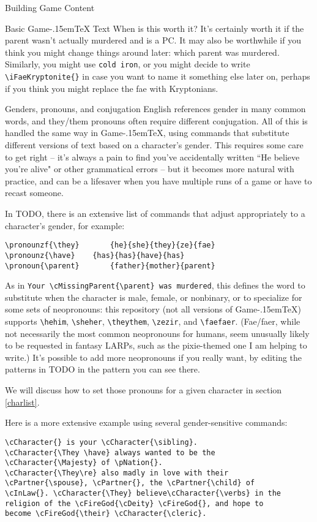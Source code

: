 \documentclass[11pt,  total={6in, 8in}]{article}
\def\gametex{\mbox{Game\kern-.15em\TeX}}
\newcommand{\pronounfile}{TODO}
\begin{document}
\begin{section}{Building Game Content}
\begin{subsection}{Basic \gametex{} Text}
When is this worth it?  It's certainly worth it if the parent wasn't actually murdered and is a PC.  It may also be worthwhile if you think you might change things around later: which parent was murdered.  Similarly, you might use \lstinline|cold iron|, or you might decide to write \lstinline|\iFaeKryptonite{}| in case you want to name it something else later on, perhaps if you think you might replace the fae with Kryptonians.
\end{subsection}
\begin{subsection}{Genders, pronouns, and conjugation}
English references gender in many common words, and they/them pronouns often require different conjugation.  All of this is handled the same way in \gametex{}, using commands that substitute different versions of text based on a character's gender.  This requires some care to get right – it's always a pain to find you've accidentally written ``He believe you're alive" or other grammatical errors – but it becomes more natural with practice, and can be a lifesaver when you have multiple runs of a game or have to recast someone.

In \pronounfile{}, there is an extensive list of commands that adjust appropriately to a character's gender, for example:
\begin{verbatim}
\pronounzf{\they}		{he}{she}{they}{ze}{fae}
\pronounz{\have}	{has}{has}{have}{has}
\pronoun{\parent}		{father}{mother}{parent}
\end{verbatim}

As in \lstinline|Your \cMissingParent{\parent} was murdered|, this defines the word to substitute when the character is male, female, or nonbinary, or to specialize for some sets of neopronouns: this repository (not all versions of \gametex{}) supports \lstinline{\hehim}, \lstinline{\sheher}, \lstinline{\theythem}, \lstinline{\zezir}, and \lstinline{\faefaer}.  (Fae/faer, while not necessarily the most common neopronouns for humans, seem unusually likely to be requested in fantasy LARPs, such as the pixie-themed one I am helping to write.)  It's possible to add more neopronouns if you really want, by editing the patterns in \pronounfile{} in the pattern you can see there.

We will discuss how to set those pronouns for a given character in section \ref{charlist}.

Here is a more extensive example using several gender-sensitive commands:

\begin{verbatim}
\cCharacter{} is your \cCharacter{\sibling}.
\cCharacter{\They \have} always wanted to be the
\cCharacter{\Majesty} of \pNation{}.  
\cCharacter{\They\re} also madly in love with their 
\cPartner{\spouse}, \cPartner{}, the \cPartner{\child} of 
\cInLaw{}. \cCharacter{\They} believe\cCharacter{\verbs} in the 
religion of the \cFireGod{\cDeity} \cFireGod{}, and hope to 
become \cFireGod{\their} \cCharacter{\cleric}.
\end{verbatim} 


\end{subsection}
\end{section}
\end{document}

